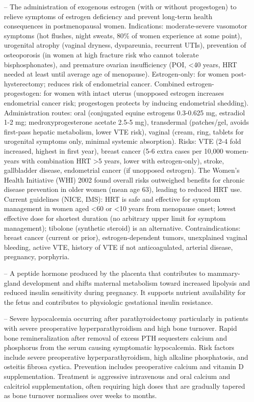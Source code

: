 -- The administration of exogenous estrogen (with or without progestogen) to relieve symptoms of estrogen deficiency and prevent long-term health consequences in postmenopausal women. Indications: moderate-severe vasomotor symptoms (hot flushes, night sweats, 80\% of women experience at some point), urogenital atrophy (vaginal dryness, dyspareunia, recurrent UTIs), prevention of osteoporosis (in women at high fracture risk who cannot tolerate bisphosphonates), and premature ovarian insufficiency (POI, <40 years, HRT needed at least until average age of menopause). Estrogen-only: for women post-hysterectomy; reduces risk of endometrial cancer. Combined estrogen-progestogen: for women with intact uterus (unopposed estrogen increases endometrial cancer risk; progestogen protects by inducing endometrial shedding). Administration routes: oral (conjugated equine estrogens 0.3-0.625 mg, estradiol 1-2 mg; medroxyprogesterone acetate 2.5-5 mg), transdermal (patches/gel, avoids first-pass hepatic metabolism, lower VTE risk), vaginal (cream, ring, tablets for urogenital symptoms only, minimal systemic absorption). Risks: VTE (2-4 fold increased, highest in first year), breast cancer (5-6 extra cases per 10,000 women-years with combination HRT >5 years, lower with estrogen-only), stroke, gallbladder disease, endometrial cancer (if unopposed estrogen). The Women's Health Initiative (WHI) 2002 found overall risks outweighed benefits for chronic disease prevention in older women (mean age 63), leading to reduced HRT use. Current guidelines (NICE, IMS): HRT is safe and effective for symptom management in women aged <60 or <10 years from menopause onset; lowest effective dose for shortest duration (no arbitrary upper limit for symptom management); tibolone (synthetic steroid) is an alternative. Contraindications: breast cancer (current or prior), estrogen-dependent tumors, unexplained vaginal bleeding, active VTE, history of VTE if not anticoagulated, arterial disease, pregnancy, porphyria.

-- A peptide hormone produced by the placenta that contributes to mammary-gland development and shifts maternal metabolism toward increased lipolysis and reduced insulin sensitivity during pregnancy. It supports nutrient availability for the fetus and contributes to physiologic gestational insulin resistance.

-- Severe hypocalcemia occurring after parathyroidectomy particularly in patients with severe preoperative hyperparathyroidism and high bone turnover. Rapid bone remineralization after removal of excess PTH sequesters calcium and phosphorus from the serum causing symptomatic hypocalcemia. Risk factors include severe preoperative hyperparathyroidism, high alkaline phosphatosis, and osteitis fibrosa cystica. Prevention includes preoperative calcium and vitamin D supplementation. Treatment is aggressive intravenous and oral calcium and calcitriol supplementation, often requiring high doses that are gradually tapered as bone turnover normalises over weeks to months.

